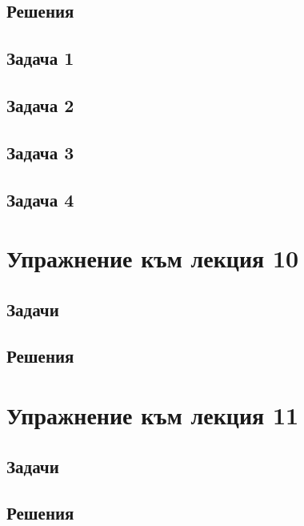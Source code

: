 \documentclass[a4paper,fleqn,12pt]{article}
\theoremstyle{definition}
\begin{document}
\newpage
\subsection{Решения}

\subsection*{Задача 1}

\subsection*{Задача 2}

\subsection*{Задача 3}

\subsection*{Задача 4}


\newpage 
\section{Упражнение към лекция 10}

\subsection{Задачи}

\newpage
\subsection{Решения}

\newpage 
\section{Упражнение към лекция 11}

\subsection{Задачи}

\newpage
\subsection{Решения}
\end{document}
